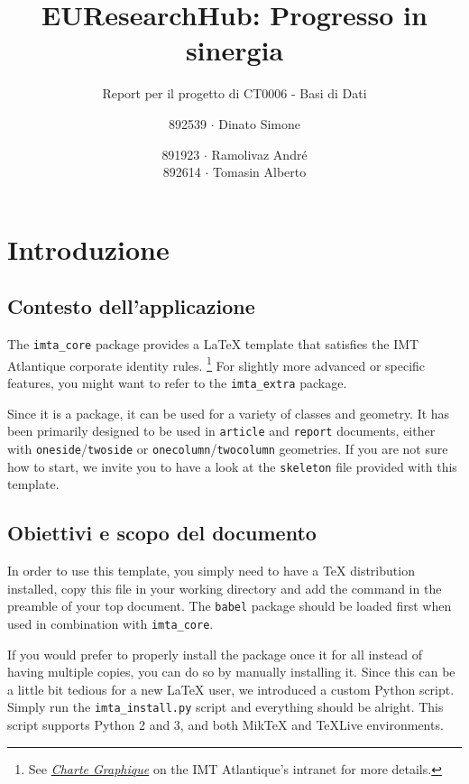 \documentclass{report}
\author{892539 $\cdot$ Dinato Simone}
\date{891923 $\cdot$ Ramolivaz André \\892614 $\cdot$ Tomasin Alberto}
\title{EUResearchHub: Progresso in sinergia}
\subtitle{Report per il progetto di CT0006 - Basi di Dati}
\begin{document}
	
\imtaMaketitlepage

\tableofcontents

\newpage




\chapter{Introduzione}


\section{Contesto dell'applicazione}
The \texttt{imta\_core} package provides a \LaTeX{} template that satisfies the IMT Atlantique corporate identity rules.
\footnote{See \textit{\href{https://intranet.imt-atlantique.fr/wp-content/uploads/2017/01/imt_atlantique_chartegraphique.pdf}{Charte Graphique}} on the IMT Atlantique's intranet for more details.} 
For slightly more advanced or specific features, you might want to refer to the \texttt{imta\_extra} package.

Since it is a package, it can be used for a variety of classes and geometry. 
It has been primarily designed to be used in \texttt{article} and \texttt{report} documents, either with \texttt{oneside}/\texttt{twoside} or \texttt{onecolumn}/\texttt{twocolumn} geometries. 
If you are not sure how to start, we invite you to have a look at the \texttt{skeleton} file provided with this template.


\section{Obiettivi e scopo del documento}
In order to use this template, you simply need to have a \TeX{} distribution installed, copy this file in your working directory and add the  command in the preamble of your top document. 
The \texttt{babel} package should be loaded first when used in combination with \texttt{imta\_core}.

If you would prefer to properly install the package once it for all instead of having multiple copies, you can do so by manually installing it. 
Since this can be a little bit tedious for a new \LaTeX{} user, we introduced a custom Python script. 
Simply run the \texttt{imta\_install.py} script and everything should be alright.
This script supports Python 2 and 3, and both Mik\TeX{} and \TeX{}Live environments. 
\end{document}
